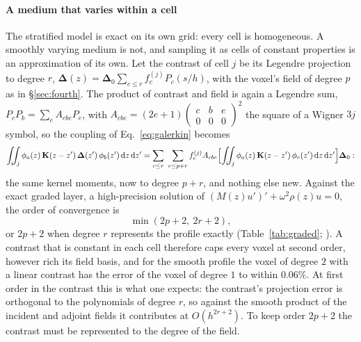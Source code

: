 \documentclass[preprint,review,12pt]{elsarticle}
\newcommand{\bK}{\mathbf{K}}
\newcommand{\bD}{\boldsymbol{\Delta}}
\newcommand{\dd}{\mathrm{d}}
\begin{document}
\paragraph{A medium that varies within a cell} The stratified model is exact on its own grid: every
cell is homogeneous. A smoothly varying medium is not, and sampling it as cells of constant
properties is an approximation of its own. Let the contrast of cell $j$ be its Legendre projection to
degree $r$, $\bD(z)=\bD_0\sum_{c\le r}f_c^{(j)}P_c(s/h)$, with the voxel's field of degree $p$ as in
\S\ref{sec:fourth}. The product of contrast and field is again a Legendre sum,
$P_cP_b=\sum_eA_{cbe}P_e$, with $A_{cbe}=(2e+1)\left(\begin{smallmatrix}c&b&e\\0&0&0\end{smallmatrix}\right)^2$
the square of a Wigner $3j$ symbol, so the coupling of Eq.~\eqref{eq:galerkin} becomes
\begin{equation}\label{eq:gradedcoupling}
  \int_i\!\!\int_j\phi_a(z)\,\bK(z-z')\,\bD(z')\,\phi_b(z')\,\dd z\,\dd z'
  =\sum_{c\le r}\ \sum_{e\le p+r}f_c^{(j)}A_{cbe}
  \Bigl[\int_i\!\!\int_j\phi_a(z)\,\bK(z-z')\,\phi_e(z')\,\dd z\,\dd z'\Bigr]\bD_0:
\end{equation}
the same kernel moments, now to degree $p+r$, and nothing else new. Against the exact graded layer, a
high-precision solution of $(M(z)u')'+\omega^2\rho(z)u=0$, the order of convergence is
\begin{equation}\label{eq:graded}
  \min(2p+2,\ 2r+2),
\end{equation}
or $2p+2$ when degree $r$ represents the profile exactly (Table~\ref{tab:graded};
). A contrast that is constant in each cell therefore caps every
voxel at second order, however rich its field basis, and for the smooth profile the voxel of degree
$2$ with a linear contrast has the error of the voxel of degree $1$ to within $0.06\%$. At first order in
the contrast this is what one expects: the contrast's projection error is orthogonal to the polynomials
of degree $r$, so against the smooth product of the incident and adjoint fields it contributes at
$O(h^{2r+2})$. To keep order $2p+2$ the contrast must be represented to the degree of the field.
\end{document}
